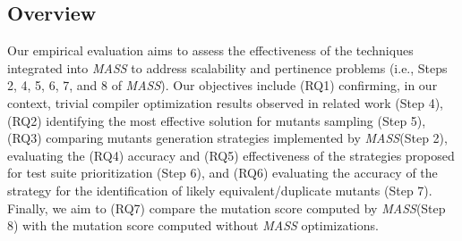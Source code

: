 


\subsection{Overview}
\label{sec:evaluation}

\renewcommand{\APPR}{\textit{MASS}\xspace}

\STARTCHANGEDNOV

Our empirical evaluation aims to assess the effectiveness of the techniques integrated into \APPR to address scalability and pertinence problems (i.e., Steps 2, 4, 5, 6, 7, and 8 of \APPR). Our objectives include (RQ1) confirming, in our context, trivial compiler optimization results observed in related work (Step 4), (RQ2) identifying the most effective solution for mutants sampling (Step 5), (RQ3) comparing mutants generation strategies implemented by \APPR (Step 2), evaluating the (RQ4) accuracy and (RQ5) effectiveness of the strategies proposed  for test suite prioritization (Step 6), and (RQ6) evaluating the accuracy of the strategy for the identification of likely equivalent/duplicate mutants (Step 7). Finally, we aim to (RQ7) compare the mutation score computed by \APPR (Step 8) with the mutation score computed without \APPR optimizations.



